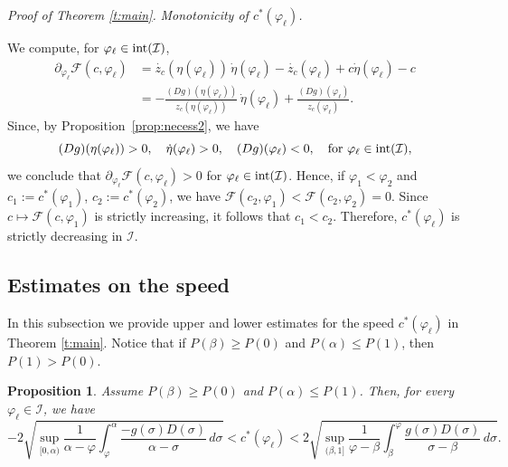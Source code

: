 \documentclass[11pt,a4paper]{article}
\newtheorem{proposition}{Proposition}[section]
\renewcommand{\phi}{\varphi}
\newenvironment{proofof}[1]{\smallskip\noindent\emph{Proof of #1.}%
\hspace{1pt}}{\hspace{-5pt}{\nobreak\quad\nobreak\hfill\nobreak%
$\square$\vspace{8pt}\par}\smallskip\goodbreak}
\begin{document}
\begin{proofof}{Theorem \ref{t:main}}
\medskip
\emph{Monotonicity of $c^*(\phi_{\ell})$.}

\noindent We compute, for $\phi_{\ell}\in{\rm int}(\mathcal{I})$, 
\begin{equation}\label{e:ift}
\begin{aligned}
\partial_{\phi_{\ell}} \mathcal{F}(c, \phi_\ell)
&= \dot{z_c}(\eta(\phi_\ell))\, \dot{\eta}(\phi_\ell) - \dot{z_c}(\phi_\ell) + c\dot{\eta}(\phi_\ell) - c \\
&= -\frac{(Dg)(\eta(\phi_\ell))}{z_c(\eta(\phi_\ell))}\, \dot{\eta}(\phi_\ell)
   + \frac{(Dg)(\phi_\ell)}{z_c(\phi_\ell)}.
\end{aligned}
\end{equation}
Since, by Proposition~\ref{prop:necess2}, we have
\[
(Dg)(\eta(\phi_\ell)) > 0,\quad \dot{\eta}(\phi_\ell) > 0,\quad (Dg)(\phi_\ell) < 0,
\quad \text{for } \phi_\ell \in {\rm int}(\mathcal I),
\]
we conclude that $\partial_{\phi_\ell} \mathcal{F}(c, \phi_\ell) > 0$ for $\phi_\ell \in {\rm int}(\mathcal I)$.
Hence, if $\varphi_1 < \varphi_2$ and $c_1 := c^*(\varphi_1)$, $c_2 := c^*(\varphi_2)$, we have
$\mathcal F(c_2,\varphi_1) < \mathcal F(c_2,\varphi_2) = 0$.
Since $c \mapsto \mathcal F(c,\varphi_1)$ is strictly increasing, it follows that $c_1 < c_2$.  
Therefore, $c^*(\varphi_\ell)$ is strictly decreasing in $\mathcal{I}$.
\end{proofof}

\subsection{Estimates on the speed}\label{ss:speed}
In this subsection we provide upper and lower estimates for the speed $c^*(\phi_\ell)$ in Theorem \ref{t:main}. 
Notice that if $P(\beta) \ge P(0)$ and $P(\alpha) \le P(1)$, then $P(1)>P(0)$.


\begin{proposition}
\label{prop:c*_bounds}
Assume $P(\beta) \ge P(0)$ and $P(\alpha) \le P(1)$.
Then, for every $\varphi_\ell \in \mathcal I$, we have
\begin{equation}
\label{e:c1c2}
-2\sqrt{\sup_{[0, \alpha)}\frac{1}{\alpha - \phi}\int_{\phi}^{\alpha}\frac{-g(\sigma)D(\sigma)}{\alpha-\sigma}\, d\sigma} < c^*(\varphi_\ell) < 2\sqrt{\sup_{(\beta,1]}\frac{1}{\phi -\beta}\int_{\beta}^{\phi}\frac{g(\sigma)D(\sigma)}{\sigma-\beta}\, d\sigma}.
\end{equation}
\end{proposition}
\end{document}
